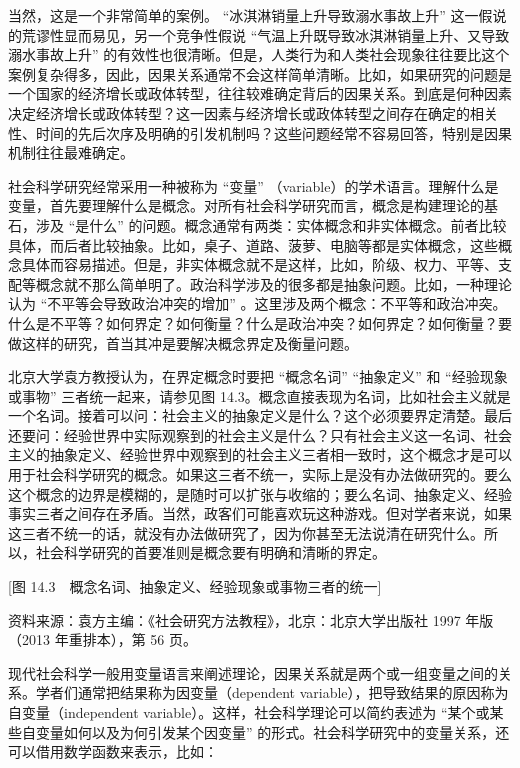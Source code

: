当然，这是一个非常简单的案例。 “冰淇淋销量上升导致溺水事故上升” 这一假说的荒谬性显而易见，另一个竞争性假说 “气温上升既导致冰淇淋销量上升、又导致溺水事故上升” 的有效性也很清晰。但是，人类行为和人类社会现象往往要比这个案例复杂得多，因此，因果关系通常不会这样简单清晰。比如，如果研究的问题是一个国家的经济增长或政体转型，往往较难确定背后的因果关系。到底是何种因素决定经济增长或政体转型？这一因素与经济增长或政体转型之间存在确定的相关性、时间的先后次序及明确的引发机制吗？这些问题经常不容易回答，特别是因果机制往往最难确定。


社会科学研究经常采用一种被称为 “变量” （variable）的学术语言。理解什么是变量，首先要理解什么是概念。对所有社会科学研究而言，概念是构建理论的基石，涉及 “是什么” 的问题。概念通常有两类：实体概念和非实体概念。前者比较具体，而后者比较抽象。比如，桌子、道路、菠萝、电脑等都是实体概念，这些概念具体而容易描述。但是，非实体概念就不是这样，比如，阶级、权力、平等、支配等概念就不那么简单明了。政治科学涉及的很多都是抽象问题。比如，一种理论认为 “不平等会导致政治冲突的增加” 。这里涉及两个概念：不平等和政治冲突。什么是不平等？如何界定？如何衡量？什么是政治冲突？如何界定？如何衡量？要做这样的研究，首当其冲是要解决概念界定及衡量问题。

北京大学袁方教授认为，在界定概念时要把 “概念名词”  “抽象定义” 和 “经验现象或事物” 三者统一起来，请参见图 14.3。概念直接表现为名词，比如社会主义就是一个名词。接着可以问：社会主义的抽象定义是什么？这个必须要界定清楚。最后还要问：经验世界中实际观察到的社会主义是什么？只有社会主义这一名词、社会主义的抽象定义、经验世界中观察到的社会主义三者相一致时，这个概念才是可以用于社会科学研究的概念。如果这三者不统一，实际上是没有办法做研究的。要么这个概念的边界是模糊的，是随时可以扩张与收缩的；要么名词、抽象定义、经验事实三者之间存在矛盾。当然，政客们可能喜欢玩这种游戏。但对学者来说，如果这三者不统一的话，就没有办法做研究了，因为你甚至无法说清在研究什么。所以，社会科学研究的首要准则是概念要有明确和清晰的界定。

[图 14.3　概念名词、抽象定义、经验现象或事物三者的统一]

资料来源：袁方主编：《社会研究方法教程》，北京：北京大学出版社 1997 年版（2013 年重排本），第 56 页。

现代社会科学一般用变量语言来阐述理论，因果关系就是两个或一组变量之间的关系。学者们通常把结果称为因变量（dependent variable），把导致结果的原因称为自变量（independent variable）。这样，社会科学理论可以简约表述为 “某个或某些自变量如何以及为何引发某个因变量” 的形式。社会科学研究中的变量关系，还可以借用数学函数来表示，比如：

